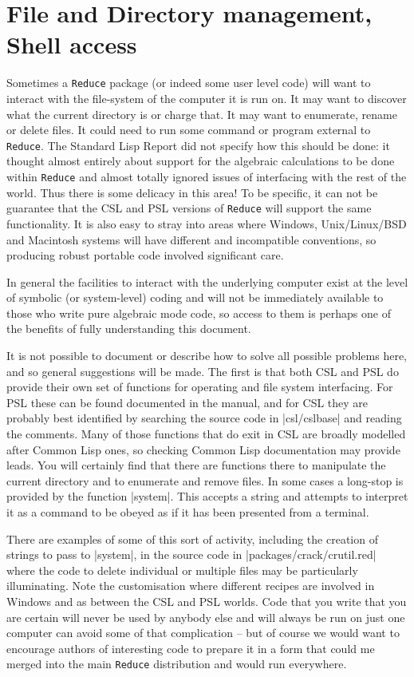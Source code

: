 \documentclass[12pt,twoside,openright]{memoir}
\newcommand{\reduce}{\texttt{Reduce}\xspace}
\begin{document}
\section{File and Directory management, Shell access}

Sometimes a \reduce package (or indeed some user level code) will want to
interact with the file-system of the computer it is run on. It may want to
discover what the current directory is or charge that. It may want to
enumerate, rename or delete files. It could need to run some command or program
external to \reduce. The Standard Lisp Report did not specify how this should
be done: it thought almost entirely about support for the algebraic
calculations to be done within \reduce and almost totally ignored issues of
interfacing with the rest of the world. Thus there is some delicacy in this
area! To be specific, it can not be guarantee that the CSL and PSL versions of
\reduce will support the same functionality. It is also easy to stray into
areas where Windows, Unix/Linux/BSD and Macintosh systems will have different
and incompatible conventions, so producing robust portable code involved
significant care.

In general the facilities to interact with the underlying computer exist at the
level of symbolic (or system-level) coding and will not be immediately available
to those who write pure algebraic mode code, so access to them is perhaps one
of the benefits of fully understanding this document.

It is not possible to document or describe how to solve all possible problems
here, and so general suggestions will be made. The first is that both CSL and
PSL do provide their own set of functions for operating and file system
interfacing. For PSL these can be found documented in the manual, and for CSL
they are probably best identified by searching the source code in |csl/cslbase|
and reading the comments. Many of those functions that do exit in CSL are
broadly modelled after Common Lisp ones, so checking Common Lisp documentation
may provide leads. You will certainly find that there are functions there to
manipulate the current directory and to enumerate and remove files. In some
cases a long-stop is provided by the function |system|. This accepts a string
and attempts to interpret it as a command to be obeyed as if it has been
presented from a terminal.

There are examples of some of this sort of activity, including the creation of
strings to pass to |system|, in the source code in |packages/crack/crutil.red|
where the code to delete individual or multiple files may be particularly
illuminating. Note the customisation where different recipes are involved in
Windows and as between the CSL and PSL worlds. Code that you write that you are
certain will never be used by anybody else and will always be run on just one
computer can avoid some of that complication -- but of course we would want to
encourage authors of interesting code to prepare it in a form that could me
merged into the main \reduce distribution and would run everywhere.
\end{document}
